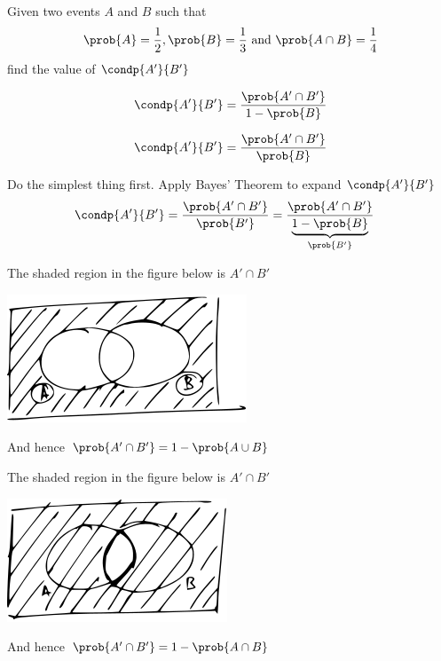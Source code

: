 \documentclass[14pt,fleqn]{extarticle}
\begin{document}
 
\begin{problem}
	\statement 
    
    Given two events $A$ and $B$ such that 
    \[ \prob{A} = \frac{1}{2}, \prob{B} = \frac{1}{3} \text{ and } \prob{A\cap B} = \frac{1}{4} \]
    find the value of $\condp{A'}{B'}$ 
          
          
   \begin{step}
  \begin{options} 
     \correct 
       
       \[ \condp{A'}{B'} = \dfrac{\prob{A'\cap B'}}{1-\prob{B}} \]
       
     \incorrect
        
     \[ \condp{A'}{B'} = \dfrac{\prob{A'\cap B'}}{\prob{B}} \]
     
    \end{options} 
     \reason 
     
     Do the simplest thing first. Apply Bayes' Theorem to expand $\condp{A'}{B'}$
     \begin{align}
	\condp{A'}{B'} &= \dfrac{\prob{A'\cap B'}}{\prob{B'}} = \dfrac{\prob{A'\cap B'}}{\underbrace{1-\prob{B}}_{\prob{B'}}} 
\end{align}
       
\end{step}

\begin{step}
  \begin{options} 
     \correct 
       
       The shaded region in the figure below is $A'\cap B'$ 
       
       \begin{center}
\includegraphics[scale=1.5]{1411-A.svg}
\end{center}
       And hence $\prob{A'\cap B'} =  1-\prob{A\cup B}$ 
       
     \incorrect
        
        The shaded region in the figure below is $A'\cap B'$ 
       
       \begin{center}
\includegraphics[scale=1.5]{1411-B.svg}
\end{center}
       And hence $\prob{A'\cap B'} =  1-\prob{A\cap B}$ 
    \end{options} 
     \reason 
       

\end{step}
\end{problem}
\end{document}
